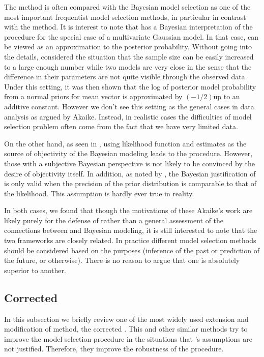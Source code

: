 The \aic method is often compared with the Bayesian model selection as one of
the most important frequentist model selection methods, in particular in
contrast with the \bic method. It is interest to note that
\textcite{Akaike1978} has a Bayesian interpretation of the \aic procedure for
the special case of a multivariate Gaussian model. In that case, \aic can be
viewed as an approximation to the posterior probability. Without going into
the details, \textcite{Akaike1978} considered the situation that the sample
size can be easily increased to a large enough number while two models are
very close in the sense that the difference in their parameters are not quite
visible through the observed data. Under this setting, it was then shown that
the log of posterior model probability from a normal priors for mean vector is
approximated by $(-1/2)$\aic up to an additive constant. However we don't see
this setting as the general cases in data analysis as argued by Akaike.
Instead, in realistic cases the difficulties of model selection problem often
come from the fact that we have very limited data.

On the other hand, as seen in \textcite{Akaike1980}, using likelihood function
and \aic estimates as the source of objectivity of the Bayesian modeling leads
to the \bic procedure. However, those with a subjective Bayesian perspective
is not likely to be convinced by the desire of objectivity itself. In
addition, as noted by \textcite{Kass1995}, the Bayesian justification of \aic
is only valid when the precision of the prior distribution is comparable to
that of the likelihood. This assumption is hardly ever true in reality.

In both cases, we found that though the motivations of these Akaike's work are
likely purely for the defense of \aic rather than a general assessment of the
connections between \aic and Bayesian modeling, it is still interested to note
that the two frameworks are closely related. In practice different model
selection methods should be considered based on the purposes (inference of the
past or prediction of the future, or otherwise). There is no reason to argue
that one is absolutely superior to another.

\subsection{Corrected \protect\aic}
\label{sub:Corrected aic}

In this subsection we briefly review one of the most widely used extension and
modification of \aic method, the corrected \aic. This and other similar
methods try to improve the model selection procedure in the situations that
\textcite{Akaike1973}'s assumptions are not justified. Therefore, they improve
the robustness of the \aic procedure.

